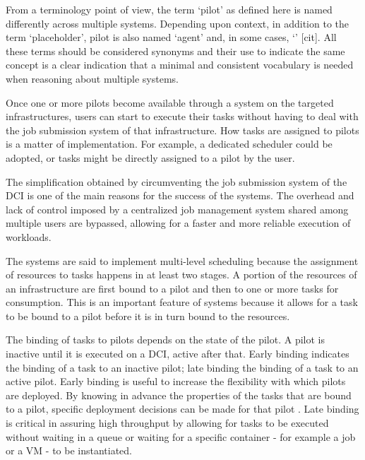 \documentclass{sig-alternate}
\begin{document}
From a terminology point of view, the term `pilot' as defined here is
named differently across multiple \pilotjob systems. Depending upon
context, in addition to the term `placeholder', pilot is also named
`agent' and, in some cases, `\pilotjob' [cit]. All these terms should be
considered synonyms and their use to indicate the same concept is a clear
indication that a minimal and consistent vocabulary is needed when reasoning
about multiple \pilotjob systems.

Once one or more pilots become available through a \pilotjob system on the
targeted infrastructures, users can start to execute their tasks without
having to deal with the job submission system of that infrastructure.
How tasks are assigned to pilots is a matter of implementation. For example, a
dedicated scheduler could be adopted, or tasks might be directly assigned to a
pilot by the user. 

The simplification obtained by circumventing the job submission system of the
DCI is one of the main reasons for the success of the \pilotjob systems. The
overhead and lack of control imposed by a centralized job management system
shared among multiple users are bypassed, allowing for a faster and more
reliable execution of workloads.

The \pilotjob systems are said to implement multi-level scheduling because the
assignment of resources to tasks happens in at least two stages. A portion of
the resources of an infrastructure are first bound to a pilot and then to one
or more tasks for consumption. This is an important feature of \pilotjob
systems because it allows for a task to be bound to a pilot before it is in
turn bound to the resources.

The binding of tasks to pilots depends on the state of the pilot. A pilot is
inactive until it is executed on a DCI, active after that. Early binding indicates the binding of a task to an inactive
pilot; late binding the binding of a task to an active pilot. Early binding is
useful to increase the flexibility with which pilots are deployed. By knowing
in advance the properties of the tasks that are bound to a pilot, specific
deployment decisions can be made for that pilot  . Late binding is critical in assuring high
throughput by allowing for tasks to be executed without waiting in a queue or
waiting for a specific container - for example a job or a VM - to be
instantiated.
\end{document}
